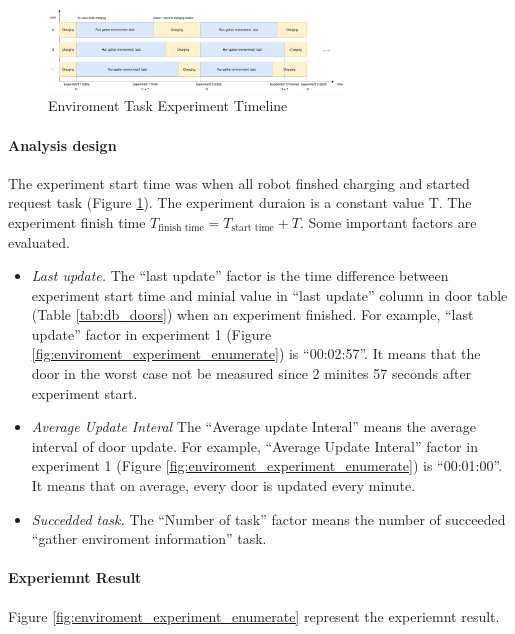 \begin{figure}[htbp]
    \centering
    \includegraphics[width = 0.7\textwidth]{content/images/ch5/env_exp_timeline.drawio.png}
    \caption{Enviroment Task Experiment Timeline}
    \label{tab:env_exp_timeline}
\end{figure}

\paragraph{Analysis design} The experiment start time was when all robot finshed charging and started request task (Figure \ref{tab:env_exp_timeline}). The experiment duraion is a constant value T. The experiment finish time $T_{\mbox{finish time}} = T_{\mbox{start time}} + T $. Some important factors are evaluated. 

\begin{itemize}
    \item \textsl{Last update.} The ``last update'' factor is the time difference between experiment start time and minial value in ``last update'' column in door table (Table \ref{tab:db_doors}) when an experiment finished. For example, ``last update'' factor in experiment 1 (Figure \ref{fig:enviroment_experiment_enumerate})  is ``00:02:57''. It means that the door in the worst case not be measured since 2 minites 57 seconds after experiment start.
    \item \textsl{Average Update Interal} The ``Average update Interal'' means the average interval of door update. For example, ``Average Update Interal'' factor in experiment 1 (Figure \ref{fig:enviroment_experiment_enumerate}) is ``00:01:00''. It means that on average, every door is updated every minute.
    \item \textsl{Succedded task.} The ``Number of task'' factor  means the number of succeeded ``gather enviroment information'' task.
\end{itemize}

\paragraph{Experiemnt Result} 
Figure \ref{fig:enviroment_experiment_enumerate} represent the experiemnt result.

